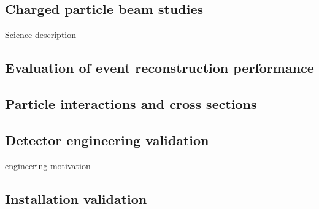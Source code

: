 

\subsection{Charged particle beam studies}
Science description

\subsection{Evaluation of event reconstruction performance}
\subsection{Particle interactions and cross sections}

\subsection{Detector engineering validation}
engineering motivation
\subsection{Installation validation}


